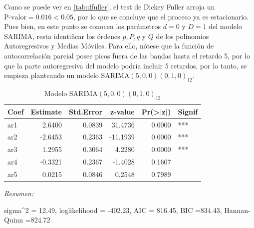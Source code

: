 \documentclass[12pt,oneside]{book}\usepackage[]{graphicx}\usepackage[]{color}
\newenvironment{knitrout}{}{} %
\theoremstyle{definition} %
\begin{document}












Como se puede ver en \ref{tab:dfuller}, el test de Dickey Fuller arroja un $\text{P-valor} = 0.016 < 0.05$, por lo que se concluye que el proceso ya es estacionario. Pues bien, en este punto se conocen los parámetros $d=0$ y $D=1$ del modelo SARIMA, resta identificar los órdenes $p, P, q$ y $Q$ de los polinomios Autoregresivos y Medias Móviles. Para ello, nótese que la función de autocorrelación parcial posee picos fuera de las  bandas hasta el retardo 5, por lo que la parte autoregresiva del modelo podría incluir 5 retardos, por lo tanto, se empieza planteando un modelo SARIMA$(5,0,0)(0,1,0)_{12}$. 

\begin{knitrout}
\color{fgcolor}\begin{table}

\caption{\label{tab:unnamed-chunk-14}\label{mod:sarima1}Modelo SARIMA$(5,0,0)(0,1,0)_{12}$}
\centering
\begin{threeparttable}
\begin{tabular}[t]{lrrrrl}
\toprule
Coef & Estimate & Std.Error & z-value & Pr(>|z|) & Signif\\
\midrule
\rowcolor{gray!6}  ar1 & 2.6400 & 0.0839 & 31.4736 & 0.0000 & ***\\
ar2 & -2.6453 & 0.2363 & -11.1939 & 0.0000 & ***\\
\rowcolor{gray!6}  ar3 & 1.2955 & 0.3064 & 4.2280 & 0.0000 & ***\\
ar4 & -0.3321 & 0.2367 & -1.4028 & 0.1607 & \\
\rowcolor{gray!6}  ar5 & 0.0215 & 0.0846 & 0.2548 & 0.7989 & \\
\bottomrule
\end{tabular}
\begin{tablenotes}
\item \textit{Resumen:} 
\item sigma\textasciicircum{}2 = 12.49, loglikelihood = -402.23, AIC = 816.45, BIC =834.43, Hannan-Quinn =824.72
\end{tablenotes}
\end{threeparttable}
\end{table}


\end{knitrout}
\end{document}
